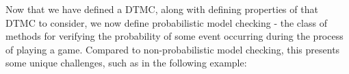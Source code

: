 

Now that we have defined a DTMC, along with defining properties of that DTMC to consider, we now define probabilistic model checking - the class of methods for verifying the probability of some event occurring during the process of playing a game. Compared to non-probabilistic model checking, this presents some unique challenges, such as in the following example:

